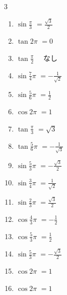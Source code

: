 \begin{multicols}{3}
\begin{enumerate}
  \item $\displaystyle \sin{\frac{\pi}{3}}$
        $\displaystyle =\frac{\sqrt{3}}{2}$

  \item $\displaystyle \tan{2\pi}$
        $\displaystyle =0$

  \item $\displaystyle \tan{\frac{\pi}{2}}$
        $\displaystyle \quad なし$

  \item $\displaystyle \sin{\frac{7}{4}\pi}$
        $\displaystyle =-\frac{1}{\sqrt{2}}$

  \item $\displaystyle \sin{\frac{5}{6}\pi}$
        $\displaystyle =\frac{1}{2}$

  \item $\displaystyle \cos{2\pi}$
        $\displaystyle =1$

  \item $\displaystyle \tan{\frac{\pi}{3}}$
        $\displaystyle =\sqrt{3}$

  \item $\displaystyle \tan{\frac{5}{6}\pi}$
        $\displaystyle =-\frac{1}{\sqrt{3}}$

  \item $\displaystyle \sin{\frac{5}{3}\pi}$
        $\displaystyle =-\frac{\sqrt{3}}{2}$

  \item $\displaystyle \sin{\frac{3}{4}\pi}$
        $\displaystyle =\frac{1}{\sqrt{2}}$

  \item $\displaystyle \sin{\frac{2}{3}\pi}$
        $\displaystyle =\frac{\sqrt{3}}{2}$

  \item $\displaystyle \cos{\frac{4}{3}\pi}$
        $\displaystyle =-\frac{1}{2}$

\columnbreak %

\resetques

  \item $\displaystyle \cos{\frac{5}{3}\pi}$
        $\displaystyle =\frac{1}{2}$

  \item $\displaystyle \sin{\frac{5}{3}\pi}$
        $\displaystyle =-\frac{\sqrt{3}}{2}$

  \item $\displaystyle \cos{2\pi}$
        $\displaystyle =1$

  \item $\displaystyle \cos{2\pi}$
        $\displaystyle =1$


\end{enumerate}
\end{multicols}
